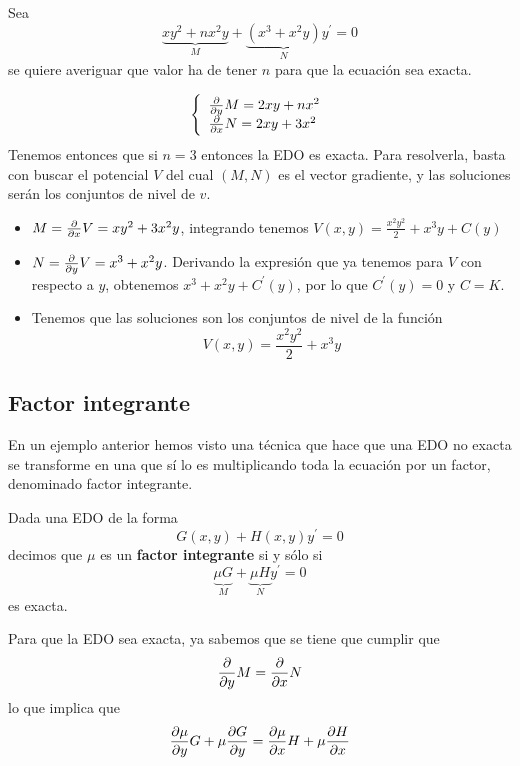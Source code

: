 \begin{example}
Sea
$$\underbrace{xy^2+nx^2y}_M+\underbrace{(x^3+x^2y)}_Ny^\prime = 0$$
se quiere averiguar que valor ha de tener $n$ para que la ecuación sea exacta.

$$
  \left\lbrace
  \begin{array}{l}
     \frac{\partial}{\partial y}M = 2xy+nx^2 \\
     \frac{\partial}{\partial x}N = 2xy+3x^2 \\
  \end{array}
  \right.
$$
Tenemos entonces que si $n=3$ entonces la EDO es exacta. Para resolverla, basta con buscar el potencial $V$ del cual $(M,N)$ es el vector gradiente, y las soluciones serán los conjuntos de nivel de $v$.
\begin{itemize}
\item $M = \frac{\partial}{\partial x}V = xy^2+3x^2y$, integrando tenemos $V(x,y) = \frac{x^2y^2}{2}+x^3y+C(y)$
\item $N = \frac{\partial}{\partial y}V = x^3+x^2y$. Derivando la expresión que ya tenemos para $V$ con respecto a $y$, obtenemos $x^3+x^2y+C^\prime(y)$, por lo que $C^\prime(y) = 0$ y $C=K$.
\item Tenemos que las soluciones son los conjuntos de nivel de la función $$V(x,y) = \frac{x^2y^2}{2}+x^3y$$
\end{itemize}
\end{example}

\subsection{Factor integrante}
En un ejemplo anterior hemos visto una técnica que hace que una EDO no exacta se transforme en una que sí lo es multiplicando toda la ecuación por un factor, denominado factor integrante.

\begin{definition}
Dada una EDO de la forma $$G(x,y)+H(x,y)y^\prime = 0$$ decimos que $\mu$ es un \textbf{factor integrante} si y sólo si $$\underbrace{\mu G}_{M}+\underbrace{\mu H}_{N}y^\prime = 0$$ es exacta.
\end{definition}

Para que la EDO sea exacta, ya sabemos que se tiene que cumplir que $$\frac{\partial}{\partial y}M = \frac{\partial}{\partial x}N$$ lo que implica que
\begin{equation}
\partialder{y}{\mu}G+\mu\partialder{y}{G} = \partialder{x}{\mu}H+\mu\partialder{x}{H}
\label{eq:factor_integrante}
\end{equation}

